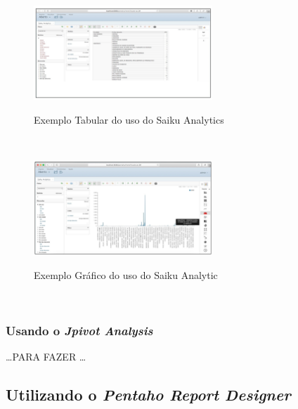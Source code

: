 \begin{figure}[H]
	\vspace*{0,2cm}
    \centering
    \caption{Exemplo Tabular do uso do Saiku Analytics}
    \includegraphics[width=0.6\textwidth]{./04-figuras/figura-puc-saiku-resultado-tabular}
    \label{fig:ilustfigpucsaikuresultadotabular}
\end{figure}
\vspace*{-0,9cm}
{\raggedright {}} \\

\begin{figure}[H]
	\vspace*{0,2cm}
    \centering
    \caption{Exemplo Gr\'{a}fico do uso do Saiku Analytic}
    \includegraphics[width=0.6\textwidth]{./04-figuras/figura-puc-saiku-resultado-grafico}
    \label{fig:ilustfigpucsaikuresultadografico}
\end{figure}
\vspace*{-0,9cm}
{\raggedright {}} \\

\subsubsection{Usando o \textit{Jpivot Analysis}}
\dots PARA FAZER \dots

\subsection{Utilizando o \textit{Pentaho Report Designer}}

